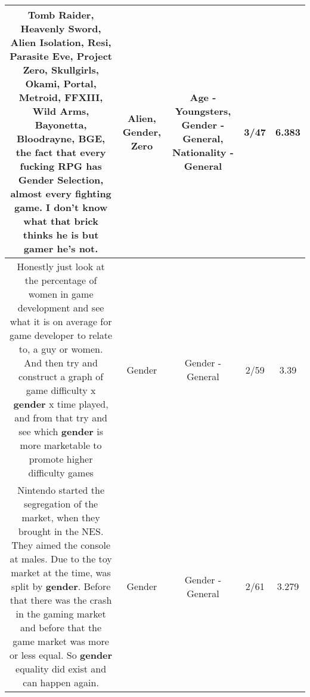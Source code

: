 \documentclass[11pt]{article}
\newlength\mylength
\begin{document}
\begin{center}
\begin{longtable}{|C{.65\mylength}|C{.30\mylength}|C{.12\mylength}|C{.12\mylength}|C{.12\mylength}|}
  \small Tomb Raider, Heavenly Sword, \textbf{Alien} Isolation, Resi, Parasite Eve, Project \textbf{Zero}, Skullgirls, Okami, Portal, Metroid, FFXIII, Wild Arms, Bayonetta, Bloodrayne, BGE, the fact that every fucking RPG has \textbf{Gender} Selection, almost every fighting game. I don't know what that brick thinks he is but gamer he's not.\normalsize   & Alien, Gender, Zero & Age - Youngsters, Gender - General, Nationality - General & 3/47 & 6.383 \\  \hline
  \small Honestly just look at the percentage of women in game development and see what it is on average for game developer to relate to, a guy or women. And then try and construct a graph of game difficulty x \textbf{gender} x time played, and from that try and see which \textbf{gender} is more marketable to promote higher difficulty games\normalsize   & Gender & Gender - General & 2/59 & 3.39 \\  \hline
  \small Nintendo started the segregation of the market, when they brought in the NES. They aimed the console at males. Due to the toy market at the time, was split by \textbf{gender}. Before that there was the crash in the gaming market and before that the game market was more or less equal. So \textbf{gender} equality did exist and can happen again.\normalsize   & Gender & Gender - General & 2/61 & 3.279 \\  \hline

\end{longtable}
\end{center}
\end{document}
